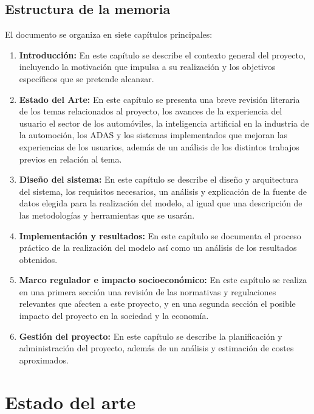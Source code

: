 \documentclass[12pt]{report} %
\begin{document}
\section{Estructura de la memoria}

El documento se organiza en siete capítulos principales:

\begin{enumerate}

    \item \textbf{Introducción:} En este capítulo se describe el contexto general del proyecto, incluyendo la motivación que impulsa a su realización y los objetivos específicos que se pretende alcanzar.
    \item \textbf{Estado del Arte:} En este capítulo se presenta una breve revisión literaria de los temas relacionados al proyecto, los avances de la experiencia del usuario el sector de los automóviles, la inteligencia artificial en la industria de la automoción, los ADAS y los sistemas implementados que mejoran las experiencias de los usuarios, además de un análisis de los  distintos trabajos previos en relación al tema. 
    \item \textbf{Diseño del sistema:} En este capítulo se describe el diseño y arquitectura del sistema, los requisitos necesarios, un análisis y explicación de la fuente de datos elegida para la realización del modelo, al igual que una descripción de las metodologías y herramientas que se usarán. 
    \item \textbf{Implementación y resultados:} En este capítulo se documenta el proceso práctico de la realización del modelo así como un análisis de los resultados obtenidos.
    \item \textbf{Marco regulador e impacto socioeconómico:} En este capítulo se realiza en una primera sección una revisión de las normativas y regulaciones relevantes que afecten a este proyecto, y en una segunda sección el posible impacto del proyecto en la sociedad y la economía.
    \item \textbf{Gestión del proyecto:} En este capítulo se describe la planificación y administración del proyecto, además de un análisis y estimación de costes aproximados.

\end{enumerate}



\chapter{Estado del arte}
\end{document}
